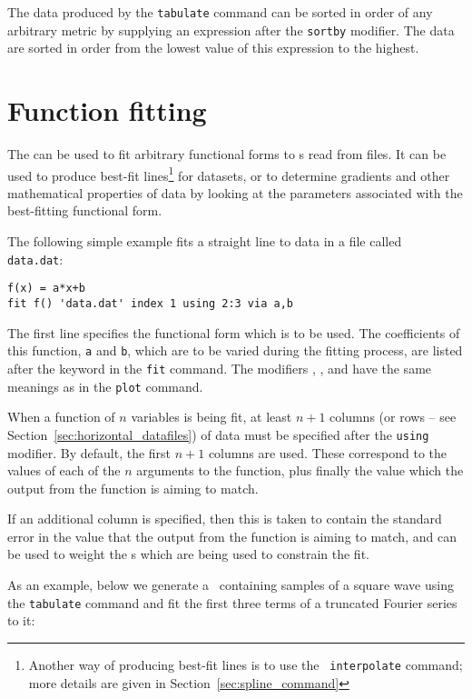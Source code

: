 The data produced by the {\tt tabulate} command can be sorted in order of any
arbitrary metric by supplying an expression after the {\tt sortby} modifier.
The data are sorted in order from the lowest value of this expression to the
highest.


\section{Function fitting}
\label{sec:fit_command}

The  can be used to fit arbitrary functional forms to \datapoint s
read from files. It can be used to produce best-fit lines\footnote{Another way of producing best-fit lines is to use the {\tt
interpolate} command; more details are given in
Section~\ref{sec:spline_command}} for datasets, or to determine gradients and
other mathematical properties of data by looking at the parameters associated
with the best-fitting functional form.

The following simple example fits a straight line to data in a file called {\tt
data.dat}:

\begin{verbatim}
f(x) = a*x+b
fit f() 'data.dat' index 1 using 2:3 via a,b
\end{verbatim}

\noindent The first line specifies the functional form which is to be used.
The coefficients of this function, {\tt a} and {\tt b}, which are to be
varied during the fitting process, are listed after the keyword 
in the {\tt fit} command.  The modifiers , ,
 and  have the same meanings as in the {\tt plot} command.

When a function of $n$ variables is being fit, at least $n+1$ columns (or rows
-- see Section~\ref{sec:horizontal_datafiles}) of data must be specified after
the {\tt using} modifier. By default, the first $n+1$ columns are used. These
correspond to the values of each of the $n$ arguments to the function, plus
finally the value which the output from the function is aiming to match.

If an additional column is specified, then this is taken to contain the
standard error in the value that the output from the function is aiming to
match, and can be used to weight the \datapoint s which are being used to
constrain the fit.

As an example, below we generate a \datafile\ containing samples of a square
wave using the {\tt tabulate} command and fit the first three terms of a
truncated Fourier series to it:

